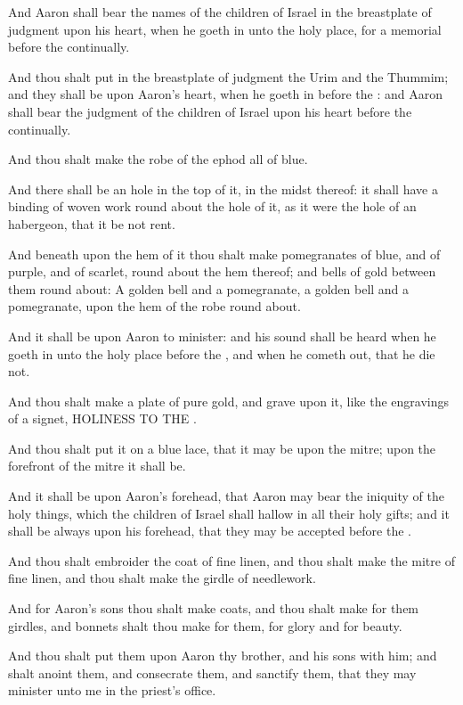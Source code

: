 \Verse And Aaron shall bear the names of the children of Israel in the breastplate of judgment upon his heart, when he goeth in unto the holy place, for a memorial before the \LORD continually.

\Verse And thou shalt put in the breastplate of judgment the Urim and the Thummim; and they shall be upon Aaron's heart, when he goeth in before the \LORD: and Aaron shall bear the judgment of the children of Israel upon his heart before the \LORD continually.

\Verse And thou shalt make the robe of the ephod all of blue.

\Verse And there shall be an hole in the top of it, in the midst thereof: it shall have a binding of woven work round about the hole of it, as it were the hole of an habergeon, that it be not rent.

\Verse And beneath upon the hem of it thou shalt make pomegranates of blue, and of purple, and of scarlet, round about the hem thereof; and bells of gold between them round about: \Verse A golden bell and a pomegranate, a golden bell and a pomegranate, upon the hem of the robe round about.

\Verse And it shall be upon Aaron to minister: and his sound shall be heard when he goeth in unto the holy place before the \LORD, and when he cometh out, that he die not.

\Verse And thou shalt make a plate of pure gold, and grave upon it, like the engravings of a signet, HOLINESS TO THE \LORD.

\Verse And thou shalt put it on a blue lace, that it may be upon the mitre; upon the forefront of the mitre it shall be.

\Verse And it shall be upon Aaron's forehead, that Aaron may bear the iniquity of the holy things, which the children of Israel shall hallow in all their holy gifts; and it shall be always upon his forehead, that they may be accepted before the \LORD.

\Verse And thou shalt embroider the coat of fine linen, and thou shalt make the mitre of fine linen, and thou shalt make the girdle of needlework.

\Verse And for Aaron's sons thou shalt make coats, and thou shalt make for them girdles, and bonnets shalt thou make for them, for glory and for beauty.

\Verse And thou shalt put them upon Aaron thy brother, and his sons with him; and shalt anoint them, and consecrate them, and sanctify them, that they may minister unto me in the priest's office.

